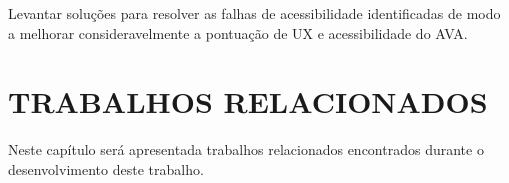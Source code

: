 \documentclass[
	12pt,				%
	openright,			%
	oneside,			%
	a4paper,			%
	chapter=TITLE,		%
	section=TITLE,		%
	subsection=TITLE,	%
	subsubsection=TITLE,%
	english,			%
	brazil				%
	]{abntex2}
\theoremstyle{definition}
\begin{document}
Levantar soluções para resolver as falhas de acessibilidade identificadas de modo a melhorar consideravelmente a pontuação de UX e acessibilidade do AVA.
    


\chapter{TRABALHOS RELACIONADOS}

Neste capítulo será apresentada trabalhos relacionados encontrados durante o desenvolvimento deste trabalho.





\end{document}
